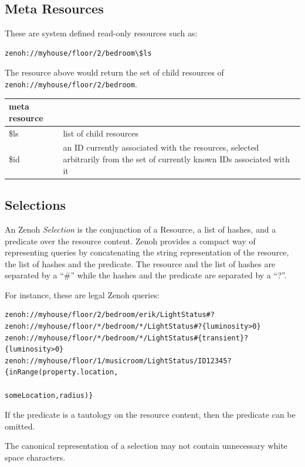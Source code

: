 \documentclass[a4paper,oneside,article]{memoir}
\begin{document}
\subsection{Meta Resources}

These are system defined read-only resources such as:

\begin{verbatim}
zenoh://myhouse/floor/2/bedroom\$ls
\end{verbatim}

The resource above would return the set of child resources of \verb|zenoh://myhouse/floor/2/bedroom|.

\begin{tabu}{lX}
  meta resource & \\ \hline
  \$ls          & list of child resources \\
  \$id          & an ID currently associated with the resources, selected arbitrarily from the set of currently known IDs associated with it \\
\end{tabu}

\subsection{Selections}

An Zenoh \emph{Selection} is the conjunction of a Resource, a list of hashes, and a predicate over
the resource content.  Zenoh provides a compact way of representing queries by concatenating the
string representation of the resource, the list of hashes and the predicate.  The resource and the
list of hashes are separated by a ``\#'' while the hashes and the predicate are separated by a ``?''.

For instance, these are legal Zenoh queries:
\begin{verbatim}
zenoh://myhouse/floor/2/bedroom/erik/LightStatus#?
zenoh://myhouse/floor/*/bedroom/*/LightStatus#?{luminosity>0}
zenoh://myhouse/floor/*/bedroom/*/LightStatus#{transient}?{luminosity>0}
zenoh://myhouse/floor/1/musicroom/LightStatus/ID12345?{inRange(property.location,
                                                              someLocation,radius)}
\end{verbatim}

If the predicate is a tautology on the resource content, then the predicate can be omitted.

The canonical representation of a selection may not contain unnecessary white space characters.
\end{document}
